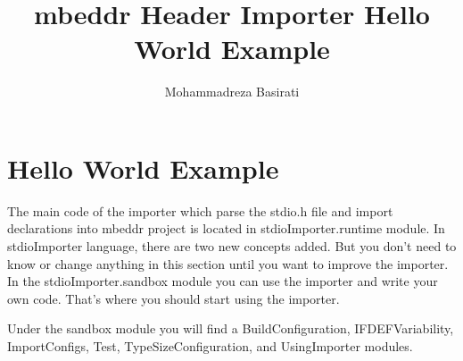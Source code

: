 \documentclass{article}
\begin{document}
\title{mbeddr Header Importer Hello World Example}
\author{Mohammadreza Basirati}
\maketitle



\section{Hello World Example}

The main code of the importer which parse the stdio.h file and import declarations into mbeddr project is located in stdioImporter.runtime module. In stdioImporter language, there are two new concepts added. But you don't need to know or change anything in this section until you want to improve the importer. In the stdioImporter.sandbox module you can use the importer and write your own code. That's where you should start using the importer.

Under the sandbox module you will find a BuildConfiguration, IFDEFVariability, ImportConfigs, Test, TypeSizeConfiguration, and UsingImporter modules.
\end{document}
